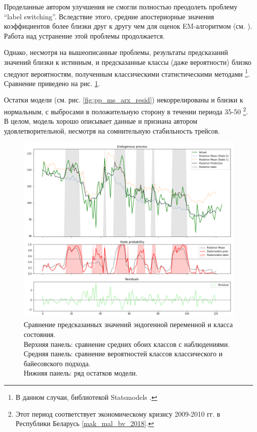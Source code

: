 \documentclass[a4paper,14pt]{extreport}
\begin{document}
Проделанные автором улучшения не смогли полностью преодолеть проблему ``label switching''. Вследствие этого, средние апостериорные значения коэффициентов более близки друг к другу чем для оценок EM-алгоритмом (см. ). Работа над устранение этой проблемы продолжается. 

Однако, несмотря на вышеописанные проблемы, результаты предсказаний значений близки к истинным, и предсказанные классы (даже вероятности) близко следуют вероятностям, полученным классическими статистическими методами \footnote{В данном случаи, библиотекой Statsmodels \cite{statsmodels}. }. Сравнение приведено на рис. \ref{fig:pp_ms_arx_fit}.

Остатки модели (см. рис. \ref{fig:pp_ms_arx_resid}) некоррелированы и близки к нормальным, с выбросами в положительную сторону в течении периода 35-50 \footnote{Этот период соответствует экономическому кризису 2009-2010 гг. в Республики Беларусь \ref{mak_mal_bv_2018}. }. В целом, модель хорошо описывает данные и признана автором удовлетворительной, несмотря на сомнительную стабильность трейсов.

\begin{figure}[H]
	\includegraphics[width=\linewidth]{img/gen/pp_ms_arx_fit.png}
	\caption{
		Сравнение предсказанных значений эндогенной переменной и класса состояния. \\
		Верхняя панель: сравнение средних обоих классов с наблюдениями. \\
		Средняя панель: сравнение вероятностей классов классического и байесовского подхода. \\
		Нижняя панель: ряд остатков модели.
	}
	\label{fig:pp_ms_arx_fit}
\end{figure}
\end{document}
